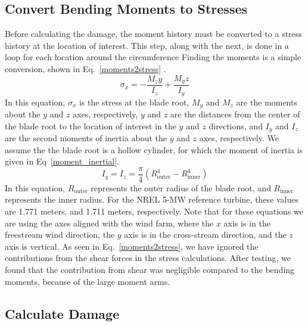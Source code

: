 \documentclass[11pt,letterpaper]{article}
\begin{document}
\subsection{Convert Bending Moments to Stresses}
Before calculating the damage, the moment history must be converted to a stress history at the location of interest. This step, along with the next, is done in a loop for each location around the circumference Finding the moments is a simple conversion, shown in Eq.~\ref{moments2stress} \cite{budynas2020shigley}.
% 
\begin{equation}
    \sigma_x = -\frac{M_z y}{I_z} + \frac{M_y z}{I_y}
    \label{moments2stress}
\end{equation}
% 
In this equation, $\sigma_x$ is the stress at the blade root, $M_y$ and $M_z$ are the moments about the $y$ and $z$ axes, respectively, $y$ and $z$ are the distances from the center of the blade root to the location of interest in the $y$ and $z$ directions, and $I_y$ and $I_z$ are the second moments of inertia about the $y$ and $z$ axes, respectively. We assume the the blade root is a hollow cylinder, for which the moment of inertia is given in Eq~\ref{moment_inertial}.
% 
\begin{equation}
    I_y = I_z = \frac{\pi}{4} (R_\text{outer}^4 - R_\text{inner}^4)
    \label{moment_inertial}
\end{equation}
% 
In this equation, $R_\text{outer}$ represents the outer radius of the blade root, and $R_\text{inner}$ represents the inner radius. For the NREL 5-MW reference turbine, these values are 1.771 meters, and 1.711 meters, respectively. Note that for these equations we are using the axes aligned with the wind farm, where the $x$ axis is in the freestream wind direction, the $y$ axis is in the cross-stream direction, and the $z$ axis is vertical. As seen in Eq.~\ref{moments2stress}, we have ignored the contributions from the shear forces in the stress calculations. After testing, we found that the contribution from shear was negligible compared to the bending moments, because of the large moment arms. 


\subsection{Calculate Damage}
\end{document}
